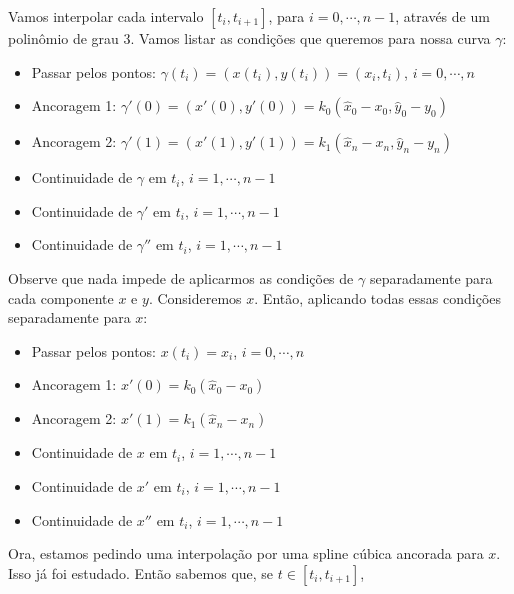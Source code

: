 \documentclass{article}
\begin{document}
\begin{enumerate}
\begin{enumerate}
                    Vamos interpolar cada intervalo $[t_i, t_{i+1}]$,
                    para $i=0,\cdots,n-1$, através de um polinômio de grau 3.
                    Vamos listar as condições que queremos para nossa curva $\gamma$:

                    \begin{itemize}
                        \item Passar pelos pontos: $\gamma(t_i) = (x(t_i), y(t_i)) = (x_i, t_i)$, $i = 0, \cdots, n$
                        \item Ancoragem 1: $\gamma'(0) = (x'(0), y'(0)) = k_0(\hat{x}_0 - x_0, \hat{y}_0 - y_0)$
                        \item Ancoragem 2: $\gamma'(1) = (x'(1), y'(1)) = k_1(\hat{x}_n - x_n, \hat{y}_n - y_n)$
                        \item Continuidade de $\gamma$ em $t_i$, $i = 1, \cdots, n-1$
                        \item Continuidade de $\gamma'$ em $t_i$, $i = 1, \cdots, n-1$
                        \item Continuidade de $\gamma''$ em $t_i$, $i = 1, \cdots, n-1$
                    \end{itemize}

                    Observe que nada impede de aplicarmos as condições de $\gamma$
                    separadamente para cada componente $x$ e $y$. Consideremos $x$.
                    Então, aplicando todas essas condições separadamente para $x$:

                    \begin{itemize}
                        \item Passar pelos pontos: $x(t_i) = x_i$, $i = 0, \cdots, n$
                        \item Ancoragem 1: $x'(0) = k_0(\hat{x}_0 - x_0)$
                        \item Ancoragem 2: $x'(1) = k_1(\hat{x}_n - x_n)$
                        \item Continuidade de $x$ em $t_i$, $i = 1, \cdots, n-1$
                        \item Continuidade de $x'$ em $t_i$, $i = 1, \cdots, n-1$
                        \item Continuidade de $x''$ em $t_i$, $i = 1, \cdots, n-1$
                    \end{itemize}

                    Ora, estamos pedindo uma interpolação por uma spline
                    cúbica ancorada para $x$. Isso já foi estudado. Então sabemos que,
                    se $t \in [t_i, t_{i+1}]$,


\end{enumerate}
\end{enumerate}
\end{document}
